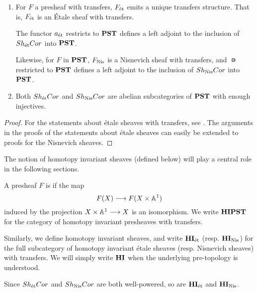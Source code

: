 \begin{prop}\label{prop_et_and_nis_sheafification}
\begin{enumerate}
\item For $F$ a presheaf with transfers, $F_{\mathrm{\acute{e}t}}$ emits a 
unique transfers structure. That is, $F_{\mathrm{\acute{e}t}}$ is an \'Etale 
sheaf with transfers.

The functor $a_{\mathrm{\acute{e}t}}$ restricts to $\mathbf{PST}$ defines a left adjoint
to the inclusion of $Sh_{\mathrm{\acute{e}t}}Cor$ into $\mathbf{PST}$. 

Likewise, for $F$ in $\mathbf{PST}$, $F_{\mathrm{Nis}}$ is a Nisnevich sheaf with
transfers, and $\nis$ restricted to $\mathbf{PST}$ defines a left adjoint 
to the inclusion of $Sh_{\mathrm{Nis}}Cor$ into $\mathbf{PST}$. 

\item Both $Sh_{\mathrm{\acute{e}t}}Cor$ and $Sh_{\mathrm{Nis}}Cor$ are abelian 
subcategories of $\mathbf{PST}$ with enough injectives.
\end{enumerate}
\end{prop}
\begin{proof}
For the statements about \'etale sheaves with transfers, see 
\cite[6.17, 6.18 and 6.19]{MVW}. The arguments in the proofs of the
statements about \'etale sheaves can easily be extended to proofs
for the Nisnevich sheaves.
\end{proof}

The notion of homotopy invariant sheaves (defined below) will play 
a central role in the following sections.

\begin{defn}
A presheaf $F$ is  if the map 
\[
F(X) \longrightarrow F(X \times \mathbb{A}^1)
\]
induced by the projection $X \times \mathbb{A}^1 \longrightarrow X$ is an isomorphism.
We write $\mathbf{HIPST}$ for the category of homotopy invariant 
presheaves with transfers.

Similarly, we define homotopy invariant sheaves, and write $\mathbf{HI}_{\mathrm{\acute{e}t}}$ 
(resp. $\mathbf{HI}_{\mathrm{Nis}}$) for the full subcategory of homotopy invariant 
\'etale sheaves (resp. Nisnevich sheaves) with transfers. We will 
simply write $\mathbf{HI}$ when the underlying pre-topology is understood.

Since $Sh_{\mathrm{\acute{e}t}}Cor$ and $Sh_{\mathrm{Nis}}Cor$ are both well-powered, so are 
$\mathbf{HI}_{\mathrm{\acute{e}t}}$ and $\mathbf{HI}_{\mathrm{Nis}}$.
\end{defn}

